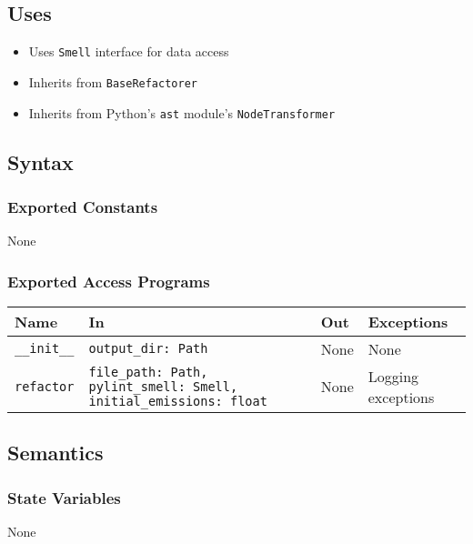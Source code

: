 \documentclass[12pt, titlepage]{article}
\begin{document}
\subsection{Uses}

\begin{itemize}
  \item Uses \texttt{Smell} interface for data access
  \item Inherits from \texttt{BaseRefactorer}
  \item Inherits from Python's \texttt{ast} module's \texttt{NodeTransformer}
\end{itemize}

\subsection{Syntax}

\subsubsection{Exported Constants}

None

\subsubsection{Exported Access Programs}

\begin{center}
\begin{tabular}{|p{3cm}|p{5cm}|p{2cm}|p{3cm}|}
\hline
\textbf{Name} & \textbf{In} & \textbf{Out} & \textbf{Exceptions} \\
\hline
\texttt{\_\_init\_\_} & \texttt{output\_dir: Path} & None & None \\
\hline
\texttt{refactor} & \texttt{file\_path: Path, pylint\_smell: Smell, initial\_emissions: float} & None & Logging exceptions \\
\hline
\end{tabular}
\end{center}

\subsection{Semantics}

\subsubsection{State Variables}

None
\end{document}

